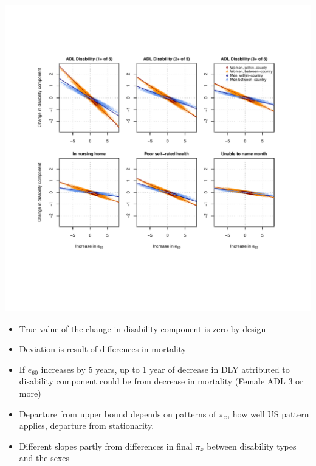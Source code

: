 \documentclass[20pt]{beamer}
\begin{document}
\begin{frame}[plain]
\begin{center}
\includegraphics[trim=1cm 0 0 2.5cm, clip, scale=1.3]{Figures/Decomp_2x3.pdf}
\end{center}
\end{frame}
\begin{frame}[plain]
\begin{itemize}[<+>]
\item True value of the change in disability component is zero by design
\item Deviation is result of differences in mortality
\item If $e_{60}$ increases by 5 years, up to 1 year of decrease in DLY attributed to disability component could be from decrease in mortality (Female ADL 3 or more)
\item Departure from upper bound depends on patterns of $\pi_x$, how well US
pattern applies, departure from stationarity.
\item Different slopes partly from differences in final $\pi_x$ between
disability types and the sexes
\end{itemize}
\end{frame}
\end{document}
